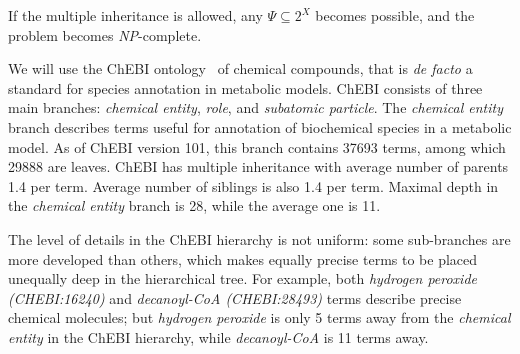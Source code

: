 \documentclass[9pt]{article}
\newcounter{rm}
\begin{document}
If the multiple inheritance is allowed, any $\Psi \subseteq 2^X$ becomes possible, and the problem becomes \textit{NP}-complete. 

We will use the ChEBI ontology~\citep{deMatos10} of chemical compounds, that is \textit{de facto} a standard for species annotation in metabolic models. ChEBI consists of three main branches: \textit{chemical entity}, \textit{role}, and \textit{subatomic particle}. The \textit{chemical entity} branch describes terms useful for annotation of biochemical species in a metabolic model. As of ChEBI version 101, this branch contains 37693 terms, among which 29888 are leaves. ChEBI has multiple inheritance with average number of parents 1.4 per term. Average number of siblings is also 1.4 per term. Maximal depth in the \textit{chemical entity} branch is 28, while the average one is 11.

The level of details in the ChEBI hierarchy is not uniform: some sub-branches are more developed than others, which makes equally precise terms to be placed unequally deep in the hierarchical tree. For example, both \textit{hydrogen peroxide (CHEBI:16240)} and \textit{decanoyl-CoA (CHEBI:28493)} terms describe precise chemical molecules; but \textit{hydrogen peroxide} is only 5 terms away from the \textit{chemical entity} in the ChEBI hierarchy, while \textit{decanoyl-CoA} is 11 terms away. 
\end{document}
